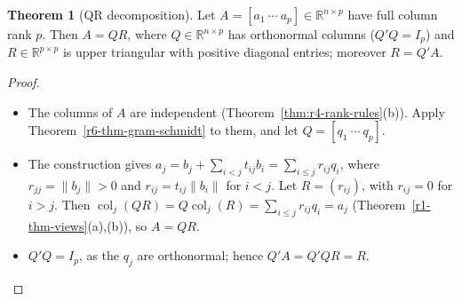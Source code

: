 \documentclass[12pt]{article}
\newcommand{\R}{\mathbb R}
\DeclareMathOperator{\col}{col}
\theoremstyle{definition}
\newtheorem{theorem}{Theorem}
\begin{document}
\begin{theorem}[QR decomposition]\label{r6-thm-qr}
Let \(A=[a_1\ \cdots\ a_p]\in\R^{n\times p}\) have full column rank \(p\). Then \(A=QR\), where
\(Q\in\R^{n\times p}\) has orthonormal columns (\(Q'Q=I_p\)) and \(R\in\R^{p\times p}\) is upper triangular with
positive diagonal entries; moreover \(R=Q'A\).
\end{theorem}
\begin{proof}
\begin{itemize}
\item The columns of \(A\) are independent (Theorem~\ref{thm:r4-rank-rules}(b)). Apply
Theorem~\ref{r6-thm-gram-schmidt} to them, and let \(Q=[q_1\ \cdots\ q_p]\).
\item The construction gives \(a_j=b_j+\sum_{i<j}t_{ij}b_i=\sum_{i\leqslant j}r_{ij}q_i\), where
\(r_{jj}=\lVert b_j\rVert>0\) and \(r_{ij}=t_{ij}\lVert b_i\rVert\) for \(i<j\). Let \(R=(r_{ij})\), with \(r_{ij}=0\) for
\(i>j\). Then \(\col_j(QR)=Q\col_j(R)=\sum_{i\leqslant j}r_{ij}q_i=a_j\) (Theorem~\ref{r1-thm-views}(a),(b)), so
\(A=QR\).
\item \(Q'Q=I_p\), as the \(q_j\) are orthonormal; hence \(Q'A=Q'QR=R\).\qedhere
\end{itemize}
\end{proof}
\end{document}
